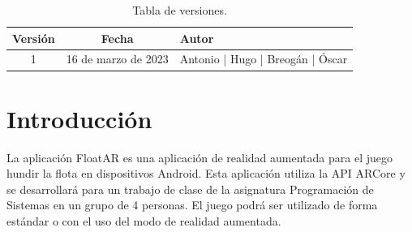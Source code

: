 \documentclass[a4paper, openright, 12pt]{article}
\begin{document}
\newpage



\tableofcontents

\vspace{5cm}

\begin{flushright}
\begin{table}[hbtp]
\begin{center}

\caption{Tabla de versiones.}
\label{tabla:versiones}
\small
\vspace{1ex}

\begin{tabular}{|c|c|l|}
\hline
Versión & Fecha & Autor \\
\hline \hline
1 & 16 de marzo de 2023 & Antonio | Hugo | Breogán | Óscar\\ \hline
\end{tabular}

\end{center}
\end{table}
\end{flushright}

\newpage

\section{Introducción}\label{cap.introduccion}
La aplicación FloatAR es una aplicación de realidad aumentada para el juego hundir la flota en dispositivos Android. Esta aplicación utiliza la API ARCore y se desarrollará para un trabajo de clase de la asignatura Programación de Sistemas en un grupo de 4 personas. El juego podrá ser utilizado de forma estándar o con el uso del modo de realidad aumentada.
\end{document}
